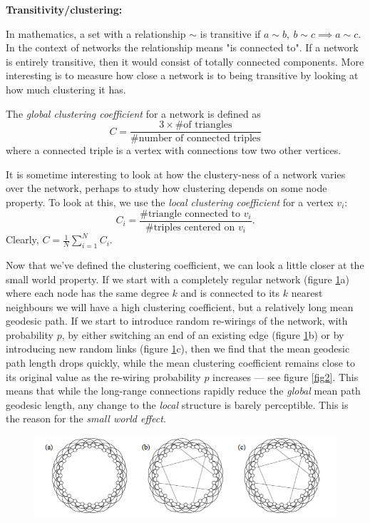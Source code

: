 \documentclass{article}
\begin{document}
{\bf Transitivity/clustering:}

In mathematics, a set with a relationship $\sim$ is transitive if $a \sim b,~b\sim c \implies a \sim c$. In the context of networks the relationship means "is connected to". If a network is entirely transitive, then it would consist of totally connected components. More interesting is to measure how close a network is to being transitive by looking at how much clustering it has.

The \emph{global clustering coefficient} for a network is defined as
$$
	C=\frac{3\times\text{\# of triangles}}{\text{\# number of connected triples}}
$$
where a connected triple is a vertex with connections tow two other vertices.

It is sometime interesting to look at how the clustery-ness of a network varies over the network, perhaps to study how clustering depends on some node property. To look at this, we use the \emph{local clustering coefficient} for a vertex $v_i$:
$$
	C_i = \frac{\text{\# triangle connected to }v_i}{\text{\# triples centered on }v_i}.
$$
Clearly, $C = \frac{1}{N}\sum_{i=1}^NC_i$.

Now that we've defined the clustering coefficient, we can look a little closer at the small world property.
If we start with a completely regular network (figure \ref{fig1}a) where each node has the same degree $k$ and is connected to its $k$ nearest neighbours we will have a high clustering coefficient, but a relatively long mean geodesic path. If we start to introduce random re-wirings of the network, with probability $p$, by either switching an end of an existing edge (figure \ref{fig1}b) or by introducing new random links (figure \ref{fig1}c), then we find that the mean geodesic path length drops quickly, while the mean clustering coefficient remains close to its original value as the re-wiring probability $p$ increases --- see figure \ref{fig2}. This means that while the long-range connections rapidly reduce the \emph{global} mean path geodesic length, any change to the \emph{local} structure is barely perceptible. This is the reason for the {\it small world effect}.

\begin{figure}
	\begin{center}
		\includegraphics[width = 12cm]{regularNW.png}
	\end{center}
	\caption{}
	\label{fig1}
\end{figure}
\end{document}

